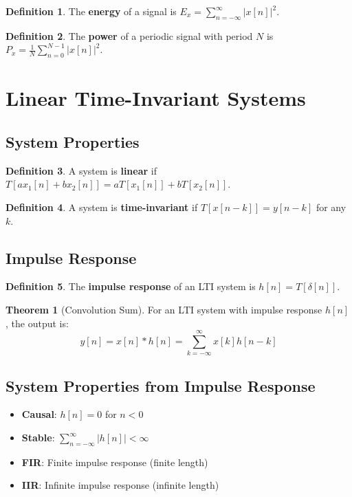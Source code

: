 \documentclass[11pt]{article}
\theoremstyle{definition}
\newtheorem{definition}{Definition}[section]
\newtheorem{theorem}{Theorem}[section]
\begin{document}
\begin{definition}
The \textbf{energy} of a signal is $E_x = \sum_{n=-\infty}^{\infty} |x[n]|^2$.
\end{definition}

\begin{definition}
The \textbf{power} of a periodic signal with period $N$ is $P_x = \frac{1}{N} \sum_{n=0}^{N-1} |x[n]|^2$.
\end{definition}

\section{Linear Time-Invariant Systems}

\subsection{System Properties}
\begin{definition}
A system is \textbf{linear} if $T[ax_1[n] + bx_2[n]] = aT[x_1[n]] + bT[x_2[n]]$.
\end{definition}

\begin{definition}
A system is \textbf{time-invariant} if $T[x[n-k]] = y[n-k]$ for any $k$.
\end{definition}

\subsection{Impulse Response}
\begin{definition}
The \textbf{impulse response} of an LTI system is $h[n] = T[\delta[n]]$.
\end{definition}

\begin{theorem}[Convolution Sum]
For an LTI system with impulse response $h[n]$, the output is:
$$y[n] = x[n] * h[n] = \sum_{k=-\infty}^{\infty} x[k]h[n-k]$$
\end{theorem}

\subsection{System Properties from Impulse Response}
\begin{itemize}
    \item \textbf{Causal}: $h[n] = 0$ for $n < 0$
    \item \textbf{Stable}: $\sum_{n=-\infty}^{\infty} |h[n]| < \infty$
    \item \textbf{FIR}: Finite impulse response (finite length)
    \item \textbf{IIR}: Infinite impulse response (infinite length)
\end{itemize}
\end{document}
